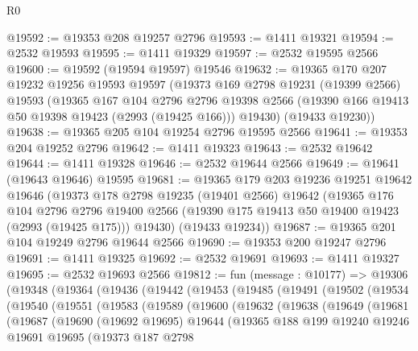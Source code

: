 \begin{lexlean}{R0}
\begin{coremodule}
@19592 := @19353 @208 @19257 @2796
@19593 := @1411 @19321
@19594 := @2532 @19593
@19595 := @1411 @19329
@19597 := @2532 @19595 @2566
@19600 := @19592 (@19594 @19597) @19546
@19632 := @19365
    @170
    @207
    @19232
    @19256
    @19593
    @19597
    (@19373
      @169
      @2798
      @19231
      (@19399 @2566)
      @19593
      (@19365
        @167
        @104
        @2796
        @2796
        @19398
        @2566
        (@19390 @166 @19413 @50 @19398 @19423 (@2993 (@19425 @166)))
        @19430)
      (@19433 @19230))
@19638 := @19365 @205 @104 @19254 @2796 @19595 @2566
@19641 := @19353 @204 @19252 @2796
@19642 := @1411 @19323
@19643 := @2532 @19642
@19644 := @1411 @19328
@19646 := @2532 @19644 @2566
@19649 := @19641 (@19643 @19646) @19595
@19681 := @19365
    @179
    @203
    @19236
    @19251
    @19642
    @19646
    (@19373
      @178
      @2798
      @19235
      (@19401 @2566)
      @19642
      (@19365
        @176
        @104
        @2796
        @2796
        @19400
        @2566
        (@19390 @175 @19413 @50 @19400 @19423 (@2993 (@19425 @175)))
        @19430)
      (@19433 @19234))
@19687 := @19365 @201 @104 @19249 @2796 @19644 @2566
@19690 := @19353 @200 @19247 @2796
@19691 := @1411 @19325
@19692 := @2532 @19691
@19693 := @1411 @19327
@19695 := @2532 @19693 @2566
@19812 := fun (message : @10177) =>
  @19306
    (@19348
      (@19364
        (@19436
          (@19442
            (@19453
              (@19485
                (@19491
                  (@19502
                    (@19534
                      (@19540
                        (@19551
                          (@19583
                            (@19589
                              (@19600
                                (@19632
                                  (@19638
                                    (@19649
                                      (@19681
                                        (@19687
                                          (@19690
                                            (@19692 @19695)
                                            @19644
                                            (@19365
                                              @188
                                              @199
                                              @19240
                                              @19246
                                              @19691
                                              @19695
                                              (@19373
                                                @187
                                                @2798

\end{coremodule}
\end{lexlean}
